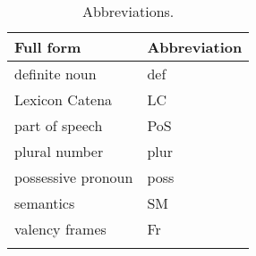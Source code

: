 \documentclass[output=paper]{langsci/langscibook}
\begin{document}
\begin{table}
\begin{tabular}{ll}
\lsptoprule
Full form  & Abbreviation \\
\midrule
definite noun & def \\
Lexicon Catena & LC \\
part of speech & PoS \\
plural number & plur \\
possessive pronoun & poss \\
semantics & SM \\
valency frames & Fr \\
\lspbottomrule
\end{tabular}
\caption{Abbreviations.}
\end{table}


{\sloppy
\printbibliography[heading=subbibliography,notkeyword=this]
}
\end{document}
